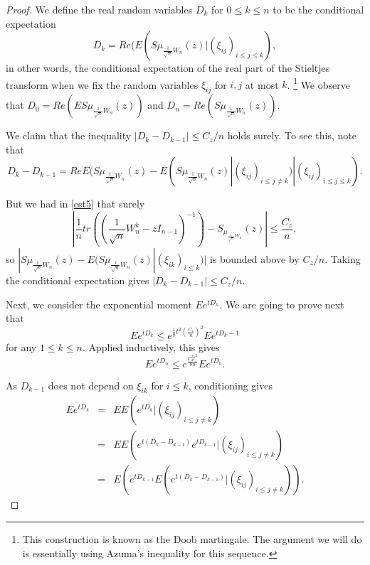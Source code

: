 \documentclass[12pt,a4paper,leqno]{report}
\theoremstyle{plain}
\theoremstyle{definition}
\theoremstyle{remark}
\begin{document}
\begin{proof}
We define the real random variables $D_k$ for $0\leq k \leq n$ to be the conditional expectation
\begin{equation*}
D_k = Re(E(S\mu_{\frac{1}{\sqrt{n}}W_n}(z)|(\xi_{ij})_{i \leq j\leq k}),
\end{equation*}
in other words, the conditional expectation of the real part of the Stieltjes transform when we fix the random variables $\xi_{ij}$ for $i,j$ at most $k$. \footnote{This construction is known as the Doob martingale. The argument we will do is essentially using Azuma's inequality for this sequence.} We observe that $D_0 = Re(ES\mu_{\frac{1}{\sqrt{n}}W_n}(z))$ and $D_n = Re(S\mu_{\frac{1}{\sqrt{n}}W_n}(z))$.

We claim that the inequality $|D_k-D_{k-1}|\leq C_z/n$ holds surely. To see this, note that
\begin{equation*}
D_k-D_{k-1} = ReE(S\mu_{\frac{1}{\sqrt{n}}W_n}(z) - E(S\mu_{\frac{1}{\sqrt{n}}W_n}(z) | (\xi_{ij})_{i \leq j \neq k}) |(\xi_{ij})_{i \leq j\leq k}).
\end{equation*}

But we had in \ref{est5} that surely 
\begin{equation*}
|\frac{1}{n}tr((\frac{1}{\sqrt{n}}W_n^k-zI_{n-1})^{-1}) - S_{\mu_{\frac{1}{\sqrt{n}}W_n}}(z)| \leq \frac{C_z}{n},
\end{equation*}
so $|S\mu_{\frac{1}{\sqrt{n}}W_n}(z) - E(S\mu_{\frac{1}{\sqrt{n}}W_n}(z)| (\xi_{ik})_{i\leq k})|$ is bounded above by $C_z/n$. Taking the conditional expectation gives $|D_k-D_{k-1}|\leq C_z/n$.

Next, we consider the exponential moment $Ee^{tD_n}$.
We are going to prove next that
\begin{equation*}
Ee^{tD_k} \leq e^{\frac{1}{8}t^2\left(\frac{C_z}{n}\right)^2} Ee^{tD_k-1}
\end{equation*}
for any $1\leq k \leq n$. Applied inductively, this gives
\begin{equation*}
Ee^{tD_n} \leq e^{\frac{C_z^2t^2}{8n}} Ee^{tD_0}.
\end{equation*}

As $D_{k-1}$ does not depend on $\xi_{ik}$ for $i\leq k$, conditioning gives
\begin{eqnarray*}
Ee^{tD_k} & = & EE(e^{tD_k}|(\xi_{ij})_{i\leq j \neq k})\\
& = & EE(e^{t(D_k-D_{k-1})}e^{tD_{k-1}}|(\xi_{ij})_{i\leq j \neq k})\\
& = & E(e^{tD_{k-1}}E(e^{t(D_k-D_{k-1})}|(\xi_{ij})_{i\leq j \neq k})).
\end{eqnarray*}


\end{proof}
\end{document}

